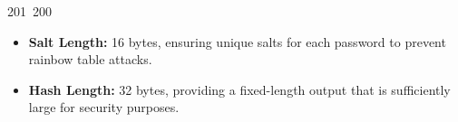 201~200~\documentclass{article}
\begin{document}
\begin{itemize}
	                                                                                                                                                                                                                                                                                                	                                                                                                                                        	    	                                                                                                	                                                                                                                                                                                                                                                                                                                                	                                                                        	                                                                        	                                                                                                    \item \textbf{Salt Length:} 16 bytes, ensuring unique salts for each password to prevent rainbow table attacks.
	                                                                                                                                                                                                                                                                                                	                                                                                                                                        	    	                                                                                                	                                                                                                                                                                                                                                                                                                                                	                                                                        	                                                                        	                                                                                                        \item \textbf{Hash Length:} 32 bytes, providing a fixed-length output that is sufficiently large for security purposes.

\end{itemize}
\end{document}
